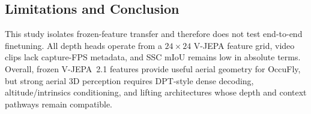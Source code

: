 \subsection{Limitations and Conclusion}
\label{sec:limitations}
\label{sec:conclusion}

This study isolates frozen-feature transfer and therefore does not test end-to-end finetuning. All depth heads operate from a $24\times24$ V-JEPA feature grid, video clips lack capture-FPS metadata, and SSC mIoU remains low in absolute terms. Overall, frozen V-JEPA~2.1 features provide useful aerial geometry for OccuFly, but strong aerial 3D perception requires DPT-style dense decoding, altitude/intrinsics conditioning, and lifting architectures whose depth and context pathways remain compatible.

